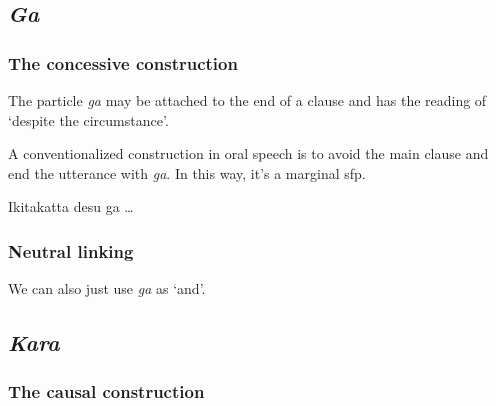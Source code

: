\documentclass[UTF8, a4paper, oneside, scheme=plain]{ctexrep}
\newcommand{\corpus}[1]{\emph{#1}}
\newcommand{\translate}[1]{`#1'}
\begin{document}
\subsection{\corpus{Ga}}

\subsubsection{The concessive construction}

The particle \corpus{ga} may be attached to the end of a clause 
and has the reading of \translate{despite the circumstance}.

A conventionalized construction in oral speech is to avoid the main clause 
and end the utterance with \corpus{ga}.
In this way, it's a marginal \ac{sfp}.

\begin{exe}
    \ex Ikitakatta desu ga \dots
\end{exe}

\subsubsection{Neutral linking}

We can also just use \corpus{ga} as \translate{and}.

\subsection{\corpus{Kara}}

\subsubsection{The causal construction}



\end{document}
